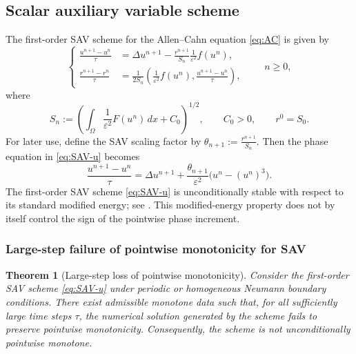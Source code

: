 \documentclass[final, 3p, times]{elsarticle}%
\newcommand{\eps}{\varepsilon}
\newtheorem{theorem}{Theorem}[section]
\begin{document}
\subsection{Scalar auxiliary variable scheme}
\label{sec:SAV}

The first-order SAV scheme for the Allen--Cahn equation \eqref{eq:AC} is given by
\begin{equation}
\left\{
\begin{aligned}
    \frac{u^{n+1}-u^n}{\tau}
    &=\Delta u^{n+1}-\frac{r^{n+1}}{S_n}\frac1{\eps^2}f(u^n),\\
    \frac{r^{n+1}-r^n}{\tau}
    &=\frac{1}{2S_n}\left(\frac1{\eps^2}f(u^n),\frac{u^{n+1}-u^n}{\tau}\right),
\end{aligned}
\right.
\qquad n\ge0,
\label{eq:SAV-u}
\end{equation}
where
\begin{equation}
    S_n:=\left(\int_\Omega\frac1{\eps^2}F(u^n)\,dx+C_0\right)^{1/2},
    \qquad
    C_0>0,
    \qquad
    r^0=S_0.
    \label{eq:Sn}
\end{equation}
For later use, define the SAV scaling factor by
$\theta_{n+1}:=\frac{r^{n+1}}{S_n}.$
Then the phase equation in \eqref{eq:SAV-u} becomes
\begin{equation}
    \frac{u^{n+1}-u^n}{\tau}
    =\Delta u^{n+1}
    +\frac{\theta_{n+1}}{\eps^2}
    \bigl(u^n-(u^n)^3\bigr).
    \label{eq:SAV-monotone-form}
\end{equation}
The first-order SAV scheme \eqref{eq:SAV-u} is unconditionally stable with
respect to its standard modified energy; see \cite{shen2018scalar}. This
modified-energy property does not by itself control the sign of the pointwise
phase increment.

\subsubsection{Large-step failure of pointwise monotonicity for SAV}

\begin{theorem}[Large-step loss of pointwise monotonicity]
\label{thm:SAV-large-step-loss}
Consider the first-order SAV scheme \eqref{eq:SAV-u} under periodic or
homogeneous Neumann boundary conditions. There exist admissible monotone
data such that, for all sufficiently large time steps \(\tau\), the
numerical solution generated by the scheme fails to preserve pointwise
monotonicity. Consequently, the scheme is not unconditionally pointwise
monotone.
\end{theorem}
\end{document}
